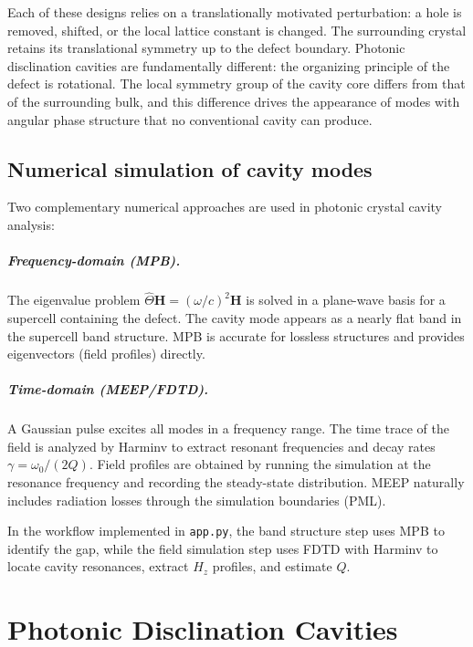 \documentclass[12pt,a4paper,oneside]{book}
\theoremstyle{plain}
\theoremstyle{definition}
\theoremstyle{remark}
\newcommand{\vb}[1]{\bm{#1}}
\newcommand{\Hfield}{\vb{H}}
\newcommand{\om}{\omega}
\begin{document}
Each of these designs relies on a translationally motivated perturbation: a hole is removed, shifted, or the local lattice constant is changed. The surrounding crystal retains its translational symmetry up to the defect boundary. Photonic disclination cavities are fundamentally different: the organizing principle of the defect is rotational. The local symmetry group of the cavity core differs from that of the surrounding bulk, and this difference drives the appearance of modes with angular phase structure that no conventional cavity can produce.

\section{Numerical simulation of cavity modes}
\label{sec:numerical}

Two complementary numerical approaches are used in photonic crystal cavity analysis:

\paragraph{Frequency-domain (MPB).} The eigenvalue problem $\hat{\Theta}\Hfield = (\om/c)^2\Hfield$ is solved in a plane-wave basis for a supercell containing the defect. The cavity mode appears as a nearly flat band in the supercell band structure. MPB is accurate for lossless structures and provides eigenvectors (field profiles) directly.

\paragraph{Time-domain (MEEP/FDTD).} A Gaussian pulse excites all modes in a frequency range. The time trace of the field is analyzed by Harminv to extract resonant frequencies and decay rates $\gamma = \om_0/(2Q)$. Field profiles are obtained by running the simulation at the resonance frequency and recording the steady-state distribution. MEEP naturally includes radiation losses through the simulation boundaries (PML).

In the workflow implemented in \texttt{app.py}, the band structure step uses MPB to identify the gap, while the field simulation step uses FDTD with Harminv to locate cavity resonances, extract $H_z$ profiles, and estimate $Q$.

\chapter{Photonic Disclination Cavities}
\label{chap:disclinations}
\end{document}
